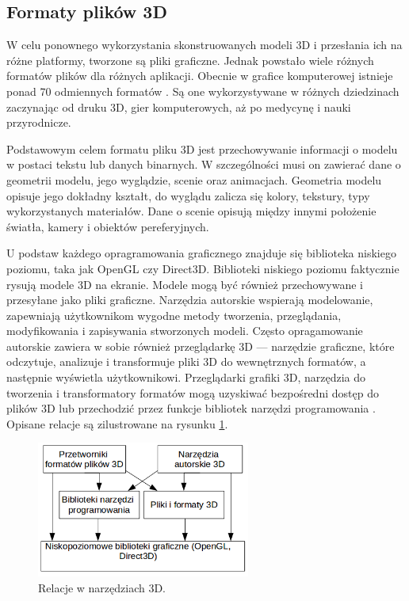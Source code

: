 \newpage
\subsection{Formaty plików 3D}
W celu ponownego wykorzystania skonstruowanych modeli 3D i przesłania ich na różne platformy, tworzone są pliki graficzne. Jednak powstało wiele różnych formatów plików dla różnych aplikacji. Obecnie w grafice komputerowej istnieje ponad 70 odmiennych formatów \cite{formatslist}. Są one wykorzystywane w różnych dziedzinach zaczynając od druku 3D, gier komputerowych, aż po medycynę i nauki przyrodnicze. 

Podstawowym celem formatu pliku 3D jest przechowywanie informacji o modelu w postaci tekstu lub danych binarnych. W szczególności musi on zawierać dane o geometrii modelu, jego wyglądzie, scenie oraz animacjach. Geometria modelu opisuje jego dokładny kształt, do wyglądu zalicza się kolory, tekstury, typy wykorzystanych materiałów. Dane o scenie opisują między innymi położenie światła, kamery i obiektów pereferyjnych. 

U podstaw każdego opragramowania graficznego znajduje się biblioteka niskiego poziomu, taka jak OpenGL czy Direct3D. Biblioteki niskiego poziomu faktycznie rysują modele 3D na ekranie. Modele mogą być również przechowywane i przesyłane jako pliki graficzne. Narzędzia autorskie wspierają modelowanie, zapewniają użytkownikom wygodne metody tworzenia, przeglądania, modyfikowania i zapisywania stworzonych modeli. Często opragamowanie autorskie zawiera w sobie również przeglądarkę 3D --- narzędzie graficzne, które odczytuje, analizuje i transformuje pliki 3D do wewnętrznych formatów, a następnie wyświetla użytkownikowi. Przeglądarki grafiki 3D, narzędzia do tworzenia i transformatory formatów mogą uzyskiwać bezpośredni dostęp do plików 3D lub przechodzić przez funkcje bibliotek narzędzi programowania \cite{formatsinfo}. Opisane relacje są zilustrowane na rysunku \ref{rys5}.
\begin{figure}[H]
		\centering
 		\includegraphics[width=7.0cm]{relacje.png}
    	\caption{Relacje w narzędziach 3D.}
 		\label{rys5}
\end{figure}

